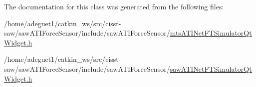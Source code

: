 The documentation for this class was generated from the following files\-:\begin{DoxyCompactItemize}
\item 
/home/adeguet1/catkin\-\_\-ws/src/cisst-\/saw/saw\-A\-T\-I\-Force\-Sensor/include/saw\-A\-T\-I\-Force\-Sensor/\hyperlink{mts_a_t_i_net_f_t_simulator_qt_widget_8h}{mts\-A\-T\-I\-Net\-F\-T\-Simulator\-Qt\-Widget.\-h}\item 
/home/adeguet1/catkin\-\_\-ws/src/cisst-\/saw/saw\-A\-T\-I\-Force\-Sensor/include/saw\-A\-T\-I\-Force\-Sensor/\hyperlink{saw_a_t_i_net_f_t_simulator_qt_widget_8h}{saw\-A\-T\-I\-Net\-F\-T\-Simulator\-Qt\-Widget.\-h}\end{DoxyCompactItemize}
